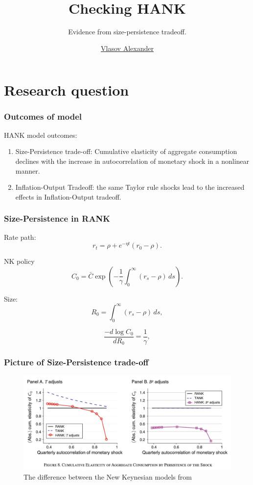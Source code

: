 \documentclass[11pt,pdf,aspectratio=129]{beamer}
\title{Checking HANK}
\subtitle{Evidence from size-persistence tradeoff.}
\author{\href{mailto://avlasov@nes.ru}{Vlasov Alexander}}
\institute{NES}
\begin{document}
\begin{frame}[fragile]
    \titlepage
\end{frame}


\section{Research question}



\begin{frame}\frametitle{Outcomes of \citet{KMV2018} model}
    \citet{KMV2018} HANK model outcomes:
    \begin{enumerate}
        \item Size-Persistence trade-off: Cumulative elasticity of aggregate consumption declines with the increase in autocorrelation of monetary shock in a nonlinear manner.
        \item Inflation-Output Tradeoff: the same Taylor rule shocks lead to the increased effects in Inflation-Output tradeoff.
    \end{enumerate}


  
\end{frame}


\begin{frame}\frametitle{Size-Persistence in RANK}
Rate path:
    \begin{equation*}
        r_t=\rho+e^{-\eta t}(r_0-\rho).\label{eq:InterestRatePath}
    \end{equation*}

NK policy    
\[C_0=\bar C\exp\left(-\frac{1}{\gamma}\int_0^\infty \left(r_s-\rho\right)\,ds\right).\]

Size:
\begin{equation*}
    R_0=\int_0^\infty \left(r_s-\rho\right)\,ds,\label{eq:KMVsize}
\end{equation*}


\[\frac{-d \log C_0}{dR_0}=\frac{1}{\gamma},\]


\end{frame}

\begin{frame}\frametitle{Picture of Size-Persistence trade-off}
    \begin{figure}\centering
        \includegraphics[scale=0.47]{Size_Persistence_KMV.png}
        \caption{The difference between the New Keynesian models from \citet{KMV2018}}
    \end{figure}
\end{frame}
\end{document}
